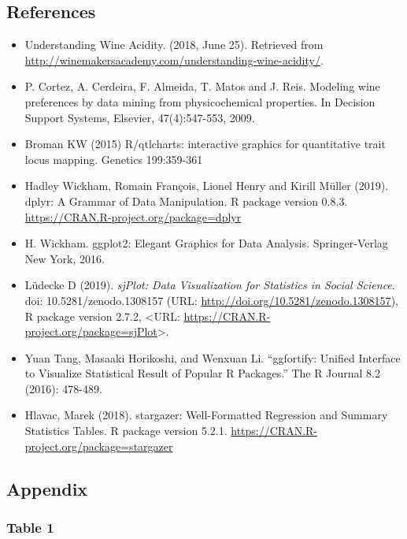 \documentclass[a4paper,9pt,twocolumn,twoside,]{pinp}
\providecommand{\tightlist}{%
  \setlength{\itemsep}{0pt}\setlength{\parskip}{0pt}}
\begin{document}
\pagebreak

\hypertarget{references}{%
\subsection{References}\label{references}}

\begin{itemize}
\tightlist
\item
  Understanding Wine Acidity. (2018, June 25). Retrieved from
  \url{http://winemakersacademy.com/understanding-wine-acidity/}.
\item
  P. Cortez, A. Cerdeira, F. Almeida, T. Matos and J. Reis. Modeling
  wine preferences by data mining from physicochemical properties. In
  Decision Support Systems, Elsevier, 47(4):547-553, 2009.
\item
  Broman KW (2015) R/qtlcharts: interactive graphics for quantitative
  trait locus mapping. Genetics 199:359-361
\item
  Hadley Wickham, Romain François, Lionel Henry and Kirill Müller
  (2019). dplyr: A Grammar of Data Manipulation. R package version
  0.8.3. \url{https://CRAN.R-project.org/package=dplyr}
\item
  H. Wickham. ggplot2: Elegant Graphics for Data Analysis.
  Springer-Verlag New York, 2016.
\item
  Lüdecke D (2019). \emph{sjPlot: Data Visualization for Statistics in
  Social Science}. doi: 10.5281/zenodo.1308157 (URL:
  \url{http://doi.org/10.5281/zenodo.1308157}), R package version 2.7.2,
  \textless URL:
  \url{https://CRAN.R-project.org/package=sjPlot}\textgreater.
\item
  Yuan Tang, Masaaki Horikoshi, and Wenxuan Li. ``ggfortify: Unified
  Interface to Visualize Statistical Result of Popular R Packages.'' The
  R Journal 8.2 (2016): 478-489.
\item
  Hlavac, Marek (2018). stargazer: Well-Formatted Regression and Summary
  Statistics Tables. R package version 5.2.1.
  \url{https://CRAN.R-project.org/package=stargazer}
\end{itemize}

\hypertarget{appendix}{%
\subsection{Appendix}\label{appendix}}

\hypertarget{table-1}{%
\subsubsection{Table 1}\label{table-1}}
\end{document}
